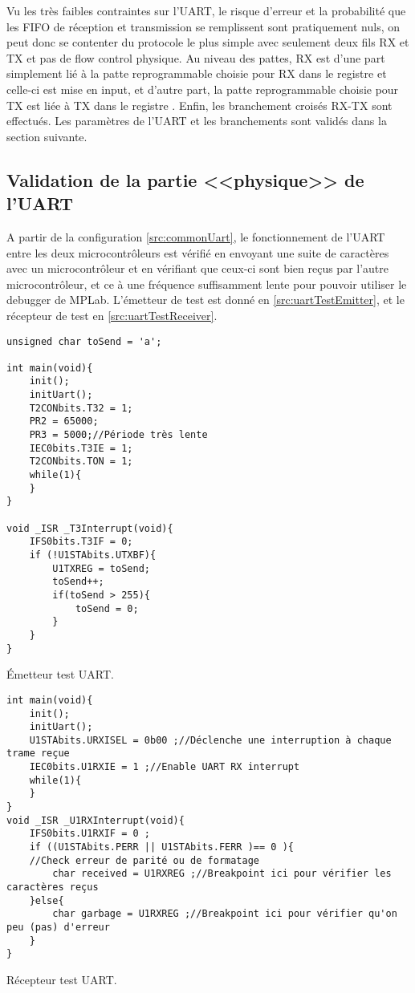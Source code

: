 Vu les très faibles contraintes sur l'UART, le risque d'erreur et la probabilité que les FIFO de réception et transmission se remplissent sont pratiquement nuls, on peut donc se contenter du protocole le plus simple avec seulement deux fils RX et TX et pas de flow control physique. Au niveau des pattes, RX est d'une part simplement lié à la patte reprogrammable choisie pour RX dans le registre  et celle-ci est mise en input, et d'autre part, la patte reprogrammable choisie pour TX est liée à TX dans le registre . Enfin, les branchement croisés RX-TX sont effectués. Les paramètres de l'UART et les branchements sont validés dans la section suivante.

\subsection{Validation de la partie <<physique>> de l'UART}
A partir de la configuration \ref{src:commonUart}, le fonctionnement de l'UART entre les deux microcontrôleurs est vérifié en envoyant une suite de caractères avec un microcontrôleur et en vérifiant que ceux-ci sont bien reçus par l'autre microcontrôleur, et ce à une fréquence suffisamment lente pour pouvoir utiliser le debugger de MPLab. L'émetteur de test est donné en \ref{src:uartTestEmitter}, et le récepteur de test en \ref{src:uartTestReceiver}.
\begin{listing}[htbp]
\begin{verbatim}
unsigned char toSend = 'a';

int main(void){
    init();
    initUart();
    T2CONbits.T32 = 1;
    PR2 = 65000;
    PR3 = 5000;//Période très lente
    IEC0bits.T3IE = 1;
    T2CONbits.TON = 1;
    while(1){
    }
}

void _ISR _T3Interrupt(void){
    IFS0bits.T3IF = 0;
    if (!U1STAbits.UTXBF){
        U1TXREG = toSend;
        toSend++;
        if(toSend > 255){
            toSend = 0;
        }
    }
}
\end{verbatim}
\caption{\'Emetteur test UART.\label{src:uartTestEmitter}}
\end{listing}
\begin{listing}[htbp]
\begin{verbatim}
int main(void){
    init();
    initUart();
    U1STAbits.URXISEL = 0b00 ;//Déclenche une interruption à chaque trame reçue
    IEC0bits.U1RXIE = 1 ;//Enable UART RX interrupt
    while(1){
    }
}
void _ISR _U1RXInterrupt(void){
    IFS0bits.U1RXIF = 0 ;
    if ((U1STAbits.PERR || U1STAbits.FERR )== 0 ){
    //Check erreur de parité ou de formatage
        char received = U1RXREG ;//Breakpoint ici pour vérifier les caractères reçus
    }else{
        char garbage = U1RXREG ;//Breakpoint ici pour vérifier qu'on peu (pas) d'erreur
    }
}
\end{verbatim}
\caption{Récepteur test UART.\label{src:uartTestReceiver}}
\end{listing}
